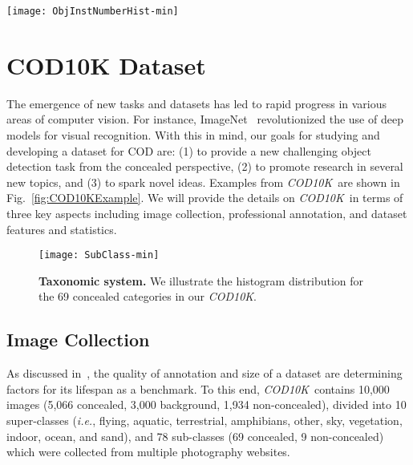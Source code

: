 \documentclass[10pt,journal,compsoc]{IEEEtran}
\def\ie{\emph{i.e.}}
\newcommand{\figref}[1]{Fig.~\ref{#1}}
\def\ourdataset{\textit{COD10K}}
\begin{document}
\begin{figure*}[t!]
  \centering
  \texttt{[image: ObjInstNumberHist-min]}
  \vspace{-25pt}
  \caption{\textbf{Object and instance distributions of each concealed category in the \ourdataset.} 
    \ourdataset~consists of 5,066 concealed images from 69 categories. 
    Zoom in for best view.
  }\label{fig:ObjInstNumberHist}
\end{figure*}

\section{COD10K Dataset}\label{sec:CODdataset}

The emergence of new tasks and datasets
\cite{cordts2016cityscapes,zhou2017scene,neuhold2017mapillary} 
has led to rapid progress in various areas of computer vision.
%
For instance, ImageNet~\cite{russakovsky2015imagenet} revolutionized 
the use of deep models for visual recognition.
%
With this in mind, our goals for studying and developing a dataset for COD are:
(1) to provide a new challenging object detection task from the concealed 
perspective,
(2) to promote research in several new topics, and
(3) to spark novel ideas.
%
Examples from \ourdataset~are shown in \figref{fig:COD10KExample}. 
We will provide the details on \ourdataset~in terms of three key aspects
including image collection, professional annotation, and dataset features 
and statistics.


\begin{figure}[t!]
  \centering
  \texttt{[image: SubClass-min]}\\
  \vspace{-18pt}
  \caption{\textbf{Taxonomic system.} We illustrate the histogram distribution 
    for the 69 concealed categories in our \ourdataset.
  }\label{fig:SubClassSystem}
\end{figure}



\subsection{Image Collection}

As discussed in~\cite{perazzi2016benchmark,wang2018revisiting,Fan2021SOC},
the quality of annotation and size of a dataset are determining factors for its
lifespan as a benchmark.
%
To this end, \ourdataset~contains 10,000 images (5,066 concealed, 
3,000 background, 1,934 non-concealed), 
divided into 10 super-classes (\ie, flying, aquatic, terrestrial, 
amphibians, other, sky, vegetation, indoor, ocean, and sand), 
and 78 sub-classes (69 concealed, 9 non-concealed) 
which were collected from multiple photography websites.
\end{document}
